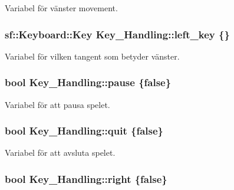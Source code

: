 Variabel för vänster movement. 

\hypertarget{classKey__Handling_a53493a34a4c7948354017b34fc9406fa}{
\subsubsection[{left\+\_\+key}]{\setlength{\rightskip}{0pt plus 5cm}sf\+::\+Keyboard\+::\+Key Key\+\_\+\+Handling\+::left\+\_\+key \{\}}}\label{classKey__Handling_a53493a34a4c7948354017b34fc9406fa}


Variabel för vilken tangent som betyder vänster. 

\hypertarget{classKey__Handling_ae297ccc0a53483abe41f2788ec7863d8}{
\subsubsection[{pause}]{\setlength{\rightskip}{0pt plus 5cm}bool Key\+\_\+\+Handling\+::pause \{false\}}}\label{classKey__Handling_ae297ccc0a53483abe41f2788ec7863d8}


Variabel för att pausa spelet. 

\hypertarget{classKey__Handling_a73a615e629c4d3db0bbecb6fd35fe31b}{
\subsubsection[{quit}]{\setlength{\rightskip}{0pt plus 5cm}bool Key\+\_\+\+Handling\+::quit \{false\}}}\label{classKey__Handling_a73a615e629c4d3db0bbecb6fd35fe31b}


Variabel för att avsluta spelet. 

\hypertarget{classKey__Handling_a494ba1ae43c55d5202f24e9bc78c5ed1}{
\subsubsection[{right}]{\setlength{\rightskip}{0pt plus 5cm}bool Key\+\_\+\+Handling\+::right \{false\}}}\label{classKey__Handling_a494ba1ae43c55d5202f24e9bc78c5ed1}


